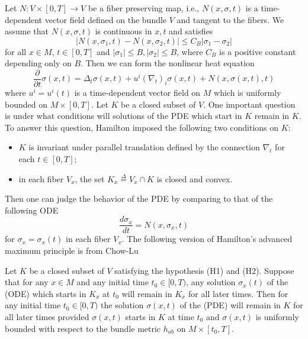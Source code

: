 Let $N: V\times [0,T]\rightarrow V$ be a fiber preserving map,
i.e., $N(x,\sigma,t)$ is a  time-dependent vector field defined on
the bundle $V$ and tangent to the fibers. We assume that
$N(x,\sigma,t)$ is continuous in $x,t$ and satisfies
$$
|N(x,\sigma_1,t) - N(x,\sigma_2,t)| \leq C_B |\sigma_1 -\sigma_2|
$$
for all $ x \in M$, $t\in [0,T]$ and $|\sigma_1|\leq B,
|\sigma_2|\leq B$, where $C_B$ is a positive constant depending
only on $B$. Then we can form the nonlinear heat equation
\begin{equation*}
\frac{\partial}{\partial t}\sigma(x,t)=
\Delta_t\sigma(x,t)+u^i(\nabla_t)_i\sigma(x,t)+N(x,\sigma(x,t),t)
\tag{PDE}
\end{equation*}
where $u^i=u^i(t)$ is a time-dependent vector field on $M$ which
is uniformly bounded on $M\times[0,T]$. Let $K$ be a closed subset
of $V$. One important question is under what conditions will
solutions of the PDE which start in $K$ remain in $K$. To answer
this question, Hamilton \cite{Ha86} imposed the following two
conditions on $K$:
\begin{itemize}
\item[(H1)] $K$ is invariant under parallel translation defined by
the connection $\nabla_t$ for each $t\in[0,T]$; \item[(H2)] in
each fiber $V_x$, the set $K_x\stackrel{\Delta}{=}V_x\cap K$ is
closed and convex.
\end{itemize}

\noindent Then one can judge the behavior of the PDE by comparing
to that of the following ODE
\begin{equation*}
\frac{d\sigma_x}{dt}=N(x,\sigma_x,t)\tag{ODE}
\end{equation*}
for $\sigma_x=\sigma_x(t)$ in each fiber $V_x$. The following
version of Hamilton's advanced maximum principle is from Chow-Lu
\cite{Cl04}

\begin{theorem}
  \label{thm:cz-advanced-maximum-principle-for-time-dependent-tensors}
 Let $K$ be a closed subset of $V$ satisfying the
hypothesis {\rm (H1)} and {\rm (H2)}. Suppose that for any $x\in
M$ and any initial time $t_0\in[0,T)$, any solution $\sigma_x(t)$
of the {\rm (ODE)} which starts in $K_x$ at $t_0$ will remain in
$K_x$ for all later times. Then for any initial time $t_0\in
[0,T)$ the solution $\sigma(x,t)$ of the {\rm (PDE)} will remain
in $K$ for all later times provided $\sigma(x,t)$ starts in $K$ at
time $t_0$ and $\sigma(x,t)$ is uniformly bounded with respect to
the bundle metric $h_{ab}$ on $M\times[t_0,T]$.
\end{theorem}

